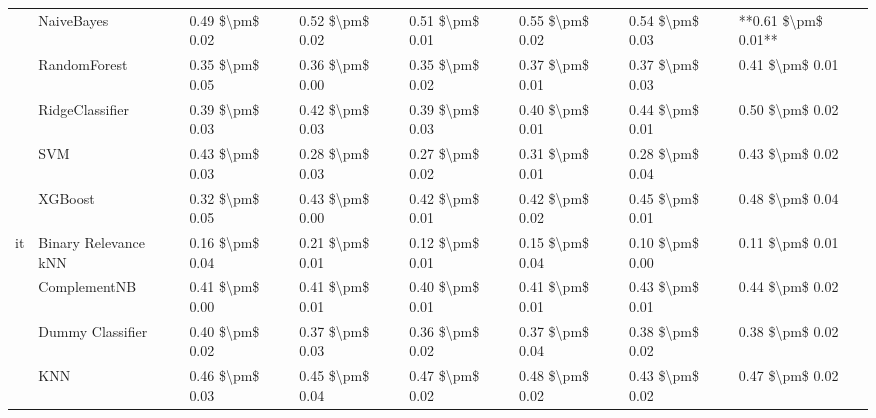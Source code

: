 \begin{tabular}{llllllll}
   & NaiveBayes &  0.49 \$\textbackslash pm\$ 0.02 &           0.52 \$\textbackslash pm\$ 0.02 &       0.51 \$\textbackslash pm\$ 0.01 &        0.55 \$\textbackslash pm\$ 0.02 &                         0.54 \$\textbackslash pm\$ 0.03 &  **0.61 \$\textbackslash pm\$ 0.01** \\
   & RandomForest &  0.35 \$\textbackslash pm\$ 0.05 &           0.36 \$\textbackslash pm\$ 0.00 &       0.35 \$\textbackslash pm\$ 0.02 &        0.37 \$\textbackslash pm\$ 0.01 &                         0.37 \$\textbackslash pm\$ 0.03 &      0.41 \$\textbackslash pm\$ 0.01 \\
   & RidgeClassifier &  0.39 \$\textbackslash pm\$ 0.03 &           0.42 \$\textbackslash pm\$ 0.03 &       0.39 \$\textbackslash pm\$ 0.03 &        0.40 \$\textbackslash pm\$ 0.01 &                         0.44 \$\textbackslash pm\$ 0.01 &      0.50 \$\textbackslash pm\$ 0.02 \\
   & SVM &  0.43 \$\textbackslash pm\$ 0.03 &           0.28 \$\textbackslash pm\$ 0.03 &       0.27 \$\textbackslash pm\$ 0.02 &        0.31 \$\textbackslash pm\$ 0.01 &                         0.28 \$\textbackslash pm\$ 0.04 &      0.43 \$\textbackslash pm\$ 0.02 \\
   & XGBoost &  0.32 \$\textbackslash pm\$ 0.05 &           0.43 \$\textbackslash pm\$ 0.00 &       0.42 \$\textbackslash pm\$ 0.01 &        0.42 \$\textbackslash pm\$ 0.02 &                         0.45 \$\textbackslash pm\$ 0.01 &      0.48 \$\textbackslash pm\$ 0.04 \\
it & Binary Relevance kNN &  0.16 \$\textbackslash pm\$ 0.04 &           0.21 \$\textbackslash pm\$ 0.01 &       0.12 \$\textbackslash pm\$ 0.01 &        0.15 \$\textbackslash pm\$ 0.04 &                         0.10 \$\textbackslash pm\$ 0.00 &      0.11 \$\textbackslash pm\$ 0.01 \\
   & ComplementNB &  0.41 \$\textbackslash pm\$ 0.00 &           0.41 \$\textbackslash pm\$ 0.01 &       0.40 \$\textbackslash pm\$ 0.01 &        0.41 \$\textbackslash pm\$ 0.01 &                         0.43 \$\textbackslash pm\$ 0.01 &      0.44 \$\textbackslash pm\$ 0.02 \\
   & Dummy Classifier &  0.40 \$\textbackslash pm\$ 0.02 &           0.37 \$\textbackslash pm\$ 0.03 &       0.36 \$\textbackslash pm\$ 0.02 &        0.37 \$\textbackslash pm\$ 0.04 &                         0.38 \$\textbackslash pm\$ 0.02 &      0.38 \$\textbackslash pm\$ 0.02 \\
   & KNN &  0.46 \$\textbackslash pm\$ 0.03 &           0.45 \$\textbackslash pm\$ 0.04 &       0.47 \$\textbackslash pm\$ 0.02 &        0.48 \$\textbackslash pm\$ 0.02 &                         0.43 \$\textbackslash pm\$ 0.02 &      0.47 \$\textbackslash pm\$ 0.02 \\

\end{tabular}
